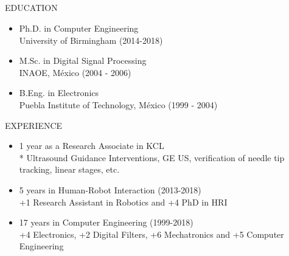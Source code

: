 

\small 

\subsection{}
{
\begin{frame}{}


EDUCATION
\begin{itemize}	
	\item Ph.D. in Computer Engineering \\
	University of Birmingham (2014-2018)
	\item M.Sc. in Digital Signal Processing \\
	INAOE, M\'exico (2004 - 2006)
	\item B.Eng. in Electronics \\
	Puebla Institute of Technology, M\'exico (1999 - 2004)
\end{itemize}

EXPERIENCE 

\begin{itemize}
	\item 1 year as a Research Associate in KCL\\
		* Ultrasound Guidance Interventions, GE US, 
		verification of needle tip tracking, linear stages, etc.
	\item 5 years in Human-Robot Interaction (2013-2018) \\
		+1 Research Assistant in Robotics and +4 PhD in HRI
	\item 17 years in Computer Engineering (1999-2018) \\
		+4 Electronics, +2 Digital Filters, +6 Mechatronics and +5 Computer Engineering
		
\end{itemize}


\end{frame}
}




